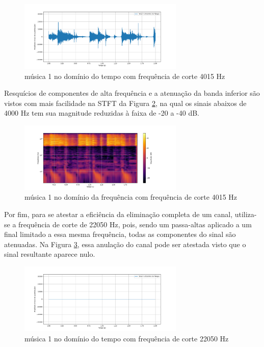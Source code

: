 \begin{figure}[h]
    \centering
    \includegraphics[width=0.7\textwidth]{figuras/fig85.png}
    \caption{música 1 no domínio do tempo com frequência de corte 4015 Hz}
    \label{fig85}
\end{figure}

Resquícios de componentes de alta frequência e a atenuação da banda inferior são vistos com mais facilidade na STFT da Figura \ref{fig86}, na qual os sinais abaixos de 4000 Hz tem sua magnitude reduzidas à faixa de -20 a -40 dB.


\begin{figure}[h]
    \centering
    \includegraphics[width=0.7\textwidth]{figuras/fig86.png}
    \caption{música 1 no domínio da frequência com frequência de corte 4015 Hz}
    \label{fig86}
\end{figure}

Por fim, para se atestar a eficiência da eliminação completa de um canal, utiliza-se a frequência de corte de 22050 Hz, pois, sendo um passa-altas aplicado a um final limitado a essa mesma frequência, todas as componentes do sinal são atenuadas. Na Figura \ref{fig87}, essa anulação do canal pode ser atestada visto que o sinal resultante aparece nulo. 

\begin{figure}[h]
    \centering
    \includegraphics[width=0.7\textwidth]{figuras/fig87.png}
    \caption{música 1 no domínio do tempo com frequência de corte 22050 Hz}
    \label{fig87}
\end{figure}

